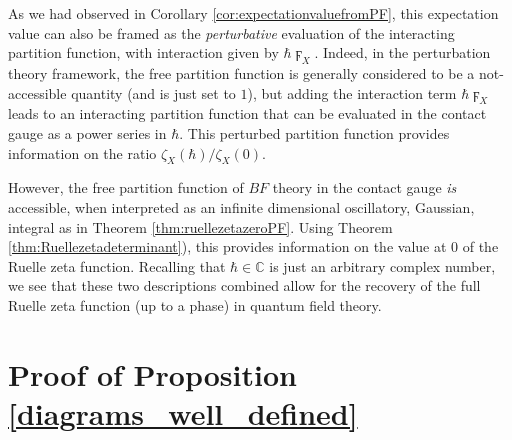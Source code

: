 \documentclass[reqno]{amsart}
\theoremstyle{definition}
\theoremstyle{remark}
\newcommand{\h}{\hbar}
\begin{document}
\begin{rmk}
As we had observed in Corollary \ref{cor:expectationvaluefromPF}, this expectation value can also be framed as the \emph{perturbative} evaluation of the interacting partition function, with interaction given by $\h \digamma_X$. Indeed, in the perturbation theory framework, the free partition function is generally considered to be a not-accessible quantity (and is just set to $1$), but adding the interaction term $\h \digamma_X$ leads to an interacting partition function that can be evaluated in the contact gauge as a power series in $\h$. This perturbed partition function provides information on the ratio $\zeta_X(\h) / \zeta_{X}(0)$.

However, the free partition function of $BF$ theory in the contact gauge \emph{is} accessible, when interpreted as an infinite dimensional oscillatory, Gaussian, integral as in Theorem \ref{thm:ruellezetazeroPF}. Using Theorem \ref{thm:Ruellezetadeterminant}), this provides information on the value at $0$ of the Ruelle zeta function.  Recalling that $\h\in\mathbb{C}$ is just an arbitrary complex number, we see that these two descriptions combined allow for the recovery of the full Ruelle zeta function (up to a phase) in quantum field theory.
\end{rmk}



\appendix


\section{Proof of Proposition \ref{diagrams_well_defined}}
\label{app:WFcomp}
\end{document}
